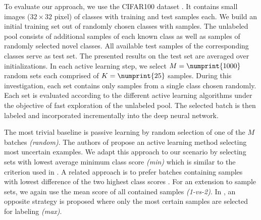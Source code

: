 \documentclass{article}
\begin{document}
To evaluate our approach, we use the CIFAR100 dataset \cite{krizhevsky2009learning}.
It contains small images ($32 \times 32$ pixel) of  classes with
 training and  test samples each.
We build an initial training set out of  randomly chosen classes with  samples.
The unlabeled pool consists of additional  samples of each known class as well as  samples of  randomly selected novel classes.
All available test samples of the  corresponding classes serve as test set.
The presented results on the test set are averaged over  initializations.
In each active learning step,
we select $M = \numprint{1000}$ random sets each comprised of $K = \numprint{25}$ samples.
During this investigation, each set contains only samples from a single class chosen randomly.
Each set is evaluated according to the different active learning algorithms under the objective of fast exploration of the unlabeled pool.
The selected batch is then labeled and incorporated incrementally into the deep neural network.

\newcommand\approach[1]{\textit{(#1)}}
The most trivial baseline is passive learning by random selection of one of the $M$ batches \approach{random}.
The authors of \cite{novotny16i-have} propose an active learning method selecting most uncertain examples.
We adapt this approach to our scenario by selecting sets with lowest average minimum class score \approach{min}
which is similar to the criterion used in \cite{wang2016cost,kapoor2010gaussian}.
A related approach is to prefer batches containing samples with lowest difference of the two highest class scores \cite{wang2016cost,joshi2009multi}.
For an extension to sample sets, we again use the mean score of all contained samples \approach{1-vs-2}.
In \cite{krause2015unreasonable}, an opposite strategy is proposed where only the most certain samples are selected for labeling \approach{max}.
\end{document}
